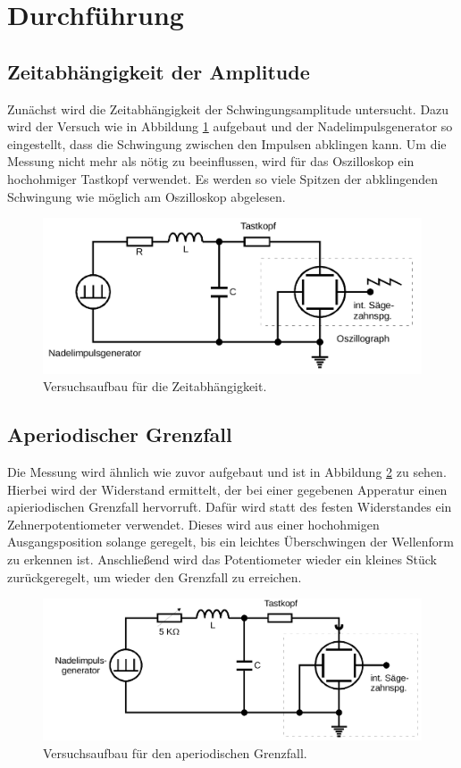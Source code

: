 \section{Durchführung}
\label{sec:Durchführung}
\subsection{Zeitabhängigkeit der Amplitude}
Zunächst wird die Zeitabhängigkeit der Schwingungsamplitude untersucht.
Dazu wird der Versuch wie in Abbildung \ref{fig:aufbau1} aufgebaut und der Nadelimpulsgenerator so eingestellt, 
dass die Schwingung zwischen den Impulsen abklingen kann.
Um die Messung nicht mehr als nötig zu beeinflussen, wird für das Oszilloskop ein hochohmiger Tastkopf verwendet.
Es werden so viele Spitzen der abklingenden Schwingung wie möglich am Oszilloskop abgelesen.
\begin{figure}[H]
    \centering
    \caption{Versuchsaufbau für die Zeitabhängigkeit.\cite{v354}}
    \label{fig:aufbau1}
    \includegraphics[width=\textwidth]{content/aufbau1.png}
\end{figure}
\noindent
%
\subsection{Aperiodischer Grenzfall}
Die Messung wird ähnlich wie zuvor aufgebaut und ist in Abbildung \ref{fig:aufbau2} zu sehen.
Hierbei wird der Widerstand ermittelt, der bei einer gegebenen Apperatur einen apieriodischen Grenzfall hervorruft.
Dafür wird statt des festen Widerstandes ein Zehnerpotentiometer verwendet. 
Dieses wird aus einer hochohmigen Ausgangsposition solange geregelt, bis ein leichtes Überschwingen der Wellenform zu erkennen ist.
Anschließend wird das Potentiometer wieder ein kleines Stück zurückgeregelt, um wieder den Grenzfall zu erreichen.
\begin{figure}[H]
    \centering
    \caption{Versuchsaufbau für den aperiodischen Grenzfall.\cite{v354}}
    \label{fig:aufbau2}
    \includegraphics[width=\textwidth]{content/aufbau2.png}
\end{figure}
\noindent
%
